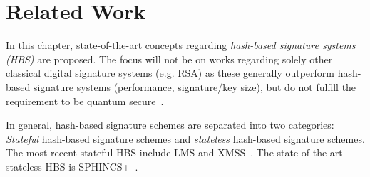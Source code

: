 \chapter{Related Work}
\label{cha:stateOfTheArt}

In this chapter, state-of-the-art concepts regarding \textit{hash-based signature systems (HBS)} are proposed. The focus will not be on works regarding solely other classical digital signature systems (e.g. RSA) as these generally outperform hash-based signature systems (performance, signature/key size), but do not fulfill the requirement to be quantum secure~\cite{RSA_pq-attack_examples_2018,comparison_performance_RSA_ECDSA_Merkle_WOTS_2021}.

In general, hash-based signature schemes are separated into two categories: \textit{Stateful} hash-based signature schemes and \textit{stateless} hash-based signature schemes. The most recent stateful HBS include LMS and XMSS~\cite{stateful_hashbased_sign_schemes_NIST_2020}. The state-of-the-art stateless HBS is SPHINCS+~\cite{tweakable_basispaper_sphincs_2019}. %








